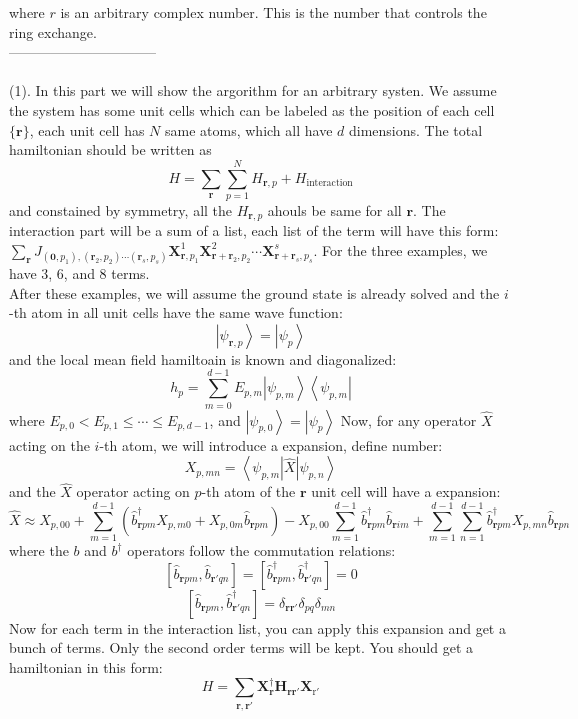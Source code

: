 \documentclass[letter]{article}
\begin{document}
where $r$ is an arbitrary complex number. This is the number that controls the ring exchange.\\
--------------------------------\\
\\
\indent (1). In this part we will show the argorithm for an arbitrary systen. We assume the system has some unit cells which can be labeled as the position of each cell $\{\bm{r}\}$, each unit cell has $N$ same atoms, which all have $d$ dimensions. The total hamiltonian should be written as $$
H=\sum_{\bm{r}}\sum_{p=1}^{N}H_{\bm{r},p}+H_{\mathrm{interaction}}
$$ and constained by symmetry, all the $H_{\bm{r},p}$ ahouls be same for all $\bm{r}$. The interaction part will be a sum of a list, each list of the term will have this form: $\sum_{\bm{r}}J_{(\bm{0},p_1),(\bm{r}_2,p_2)\cdots (\bm{r}_s,p_s)} \bm{X}^1_{\bm{r},p_1} \bm{X}^2_{\bm{r}+\bm{r}_2,p_2} \cdots\bm{X}^s_{\bm{r}+\bm{r}_s,p_s}$. For the three examples, we have 3, 6, and 8 terms. \\
 After these examples, we will assume the ground state is already solved and the $i$-th atom in all unit cells have the same wave function:$$
\left|\psi_{\bm{r},p}\right>=\left|\psi_p\right>
$$
and the local mean field hamiltoain is known and diagonalized:
$$
h_p=\sum_{m=0}^{d-1}E_{p,m}\left|\psi_{p,m}\right>\left<\psi_{p,m}\right|
$$
where $E_{p,0}<E_{p,1}\leqslant \cdots\leqslant E_{p,d-1}$, and $\left|\psi_{p,0}\right>=\left|\psi_p\right>$
Now, for any operator $\hat{X}$ acting on the $i$-th atom, we will introduce a expansion, define number: $$
X_{p,mn}=\left<\psi_{p,m}\right|\hat{X}\left|\psi_{p,n}\right>
$$
and the $\hat{X}$ operator acting on $p$-th  atom of the $\bm{r}$ unit cell will have a expansion:
$$
\hat{X}\approx X_{p,00}+\sum_{m=1}^{d-1}\left(\hat{b}_{\bm{r}pm}^{\dagger}X_{p,m0}+X_{p,0m}\hat{b}_{\bm{r}pm}\right)-X_{p,00}\sum_{m=1}^{d-1}\hat{b}^{\dagger}_{\bm{r}pm}\hat{b}_{\bm{r}im}
+\sum_{m=1}^{d-1}\sum_{n=1}^{d-1}\hat{b}^{\dagger}_{\bm{r}pm}X_{p,mn}\hat{b}_{\bm{r}pn}$$
where the $b$ and $b^{\dagger}$ operators follow the commutation relations:
$$
\left[\hat{b}_{\bm{r}pm},\hat{b}_{\bm{r}'qn}\right]=\left[\hat{b}^{\dagger}_{\bm{r}pm},\hat{b}^{\dagger}_{\bm{r}'qn}\right]=0$$
$$
\left[\hat{b}_{\bm{r}pm},\hat{b}^{\dagger}_{\bm{r}'qn}\right]=\delta_{\bm{r}\bm{r}'}\delta_{pq}\delta_{mn}$$
Now for each term in the interaction list, you can apply this expansion and get a bunch of terms. Only the second order terms will be kept. You should get a hamiltonian in this form:
 $$H=\sum_{\bm{r},\bm{r}'}\mathbf{X}^{\dagger}_{\bm{r}}\mathbf{H}_{\bm{r}\bm{r}'}\mathbf{X}_{\mathrm{r}'}$$
\end{document}
